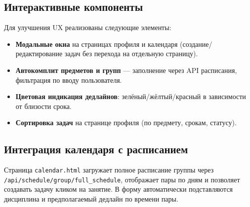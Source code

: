 \subsection{Интерактивные компоненты}

Для улучшения UX реализованы следующие элементы:
\begin{itemize}
    \item \textbf{Модальные окна} на страницах профиля и календаря (создание/редактирование задач без перехода на отдельную страницу).
    \item \textbf{Автокомплит предметов и групп} --- заполнение через API расписания, фильтрация по вводу пользователя.
    \item \textbf{Цветовая индикация дедлайнов}: зелёный/жёлтый/красный в зависимости от близости срока.
    \item \textbf{Сортировка задач} на странице профиля (по предмету, срокам, статусу).
\end{itemize}

\subsection{Интеграция календаря с расписанием}

Страница \texttt{calendar.html} загружает полное расписание группы через \texttt{/api/schedule/{group}/full\_schedule}, отображает пары по дням и позволяет создавать задачу кликом на занятие. В форму автоматически подставляются дисциплина и предполагаемый дедлайн по времени пары.
